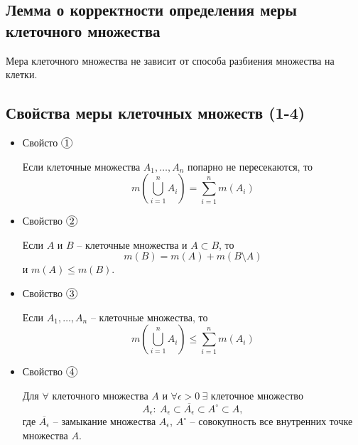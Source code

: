 \subsection{Лемма о корректности определения меры клеточного множества}

\begin{lemma}
    Мера клеточного множества не зависит от способа разбиения множества на клетки.
\end{lemma}

\subsection{Свойства меры клеточных множеств (1-4)}

\begin{itemize}
    \item Свойсто $ \circled{1} $
          \begin{statement}
              Если клеточные множества $ A_1,\ldots,A_n $ попарно не пересекаются, то
              \begin{equation}\label{eq:8.1.4}
                  m(\overset{n}{\underset{i=1}{\bigcup}}A_i) = \sum_{i=1}^{n}m(A_i)
              \end{equation}
          \end{statement}

    \item Свойство $ \circled{2} $
          \begin{statement}
              Если $ A $ и $ B $ -- клеточные множества и $ A \subset B $, то
              \begin{equation}\label{eq:8.1.5}
                  m(B) = m(A) + m(B \setminus A)
              \end{equation}
              и $ m(A) \leqslant m(B) $.
          \end{statement}

    \item Свойство $ \circled{3} $
          \begin{statement}
              Если $ A_1,\ldots,A_n $ -- клеточные множества, то
              \begin{equation}\label{eq:8.1.6}
                  m(\overset{n}{\underset{i=1}{\bigcup}}A_i) \leqslant \sum_{i=1}^{n}m(A_i)
              \end{equation}
          \end{statement}

    \item Свойство $ \circled{4} $
          \begin{statement}
              Для $ \forall $ клеточного множества $ A $ и $ \forall \epsilon > 0 \ \exists $ клеточное множество
              \[
                  A_\epsilon : \ A_\epsilon \subset \overline{A_\epsilon} \subset A^\circ \subset A,
              \]
              где $ \overline{A_\epsilon} $ -- замыкание множества $ A_\epsilon $, $ A^\circ $ -- совокупность все внутренних точке множества $ A $.
          \end{statement}
\end{itemize}

